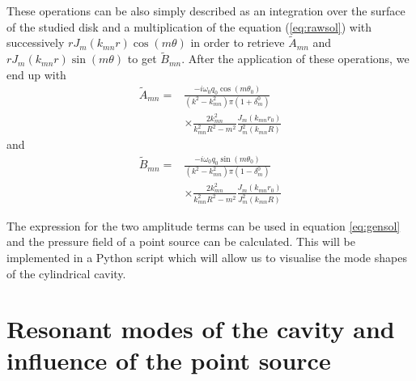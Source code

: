 \documentclass[%
 reprint,
 amsmath,amssymb,
 aps,
]{revtex4-2}
\begin{document}
These operations can be also simply described as an integration over the surface of the studied disk and a multiplication of the equation (\ref{eq:rawsol}) with successively $r J_m(k_{mn}r) \cos(m\theta)$ in order to retrieve $\tilde{A}_{mn}$ and $r J_m(k_{mn}r) \sin(m\theta)$ to get $\tilde{B}_{mn}$. After the application of these operations, we end up with
\begin{equation}
    \begin{split}
        \tilde{A}_{mn} = &
        \frac{- i \omega_0 q_0 \cos(m \theta_0)}{(k^2 - k^2_{mn}) \pi (1 + \delta_m^0)}
        \\ & \times \frac{2 k_{mn}^2}{k^2_{mn} R^2 - m^2} 
        \frac{J_m(k_{mn}r_0)}{J^2_m(k_{mn}R)}
    \end{split}
\end{equation}
and 
\begin{equation}
    \begin{split}
        \tilde{B}_{mn} = &
        \frac{- i \omega_0 q_0 \sin(m \theta_0)}{(k^2 - k^2_{mn}) \pi (1 - \delta_m^0)} 
        \\ & \times \frac{2 k_{mn}^2}{k^2_{mn} R^2 - m^2}
        \frac{J_m(k_{mn}r_0)}{J^2_m(k_{mn}R)}
    \end{split}
\end{equation}

The expression for the two amplitude terms can be used in equation \ref{eq:gensol} and the pressure field of a point source can be calculated. This will be implemented in a Python script which will allow us to visualise the mode shapes of the cylindrical cavity. %

\section{Resonant modes of the cavity and influence of the point source}
\end{document}
